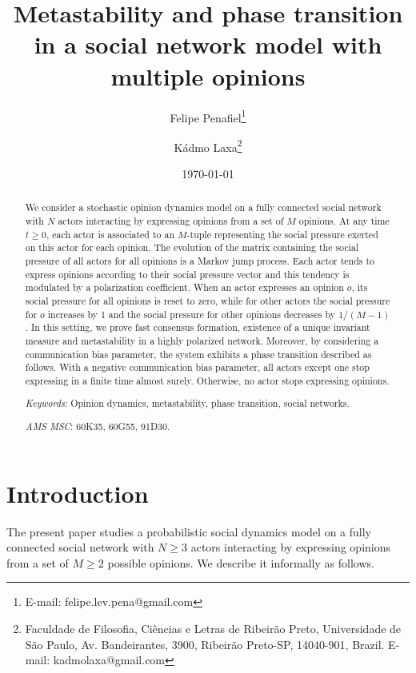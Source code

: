 \documentclass[11pt]{article}
\theoremstyle{definition}
\begin{document}
\title{
Metastability and phase transition in a social network model with multiple opinions}
\author{Felipe Penafiel\thanks{E-mail: felipe.lev.pena@gmail.com}  \\\and Kádmo Laxa\thanks{Faculdade de Filosofia, Ciências e Letras de Ribeirão Preto, Universidade de São Paulo, Av. Bandeirantes, 3900,
Ribeirão Preto-SP, 14040-901, Brazil.
 E-mail: kadmolaxa@gmail.com}}
\date{\today}
\maketitle

\begin{abstract} 
We consider a stochastic opinion dynamics model on a fully connected social network with $N$ actors interacting by expressing opinions from a set of $M$ opinions. At any time $t\geq 0$, each actor is associated to an $M$-tuple representing the social pressure exerted on this actor for each opinion. The evolution of the matrix containing the social pressure of all actors for all opinions is a Markov jump process. Each actor tends to express opinions according to their social pressure vector and this tendency is modulated by a polarization coefficient. When an actor expresses an opinion $o$, its social pressure for all opinions is reset to zero, while for other actors the social pressure for $o$ increases by 1 and the social pressure for other opinions decreases by $1/(M-1)$. 
In this setting, we prove fast consensus formation, existence of a unique invariant measure and metastability in a highly polarized network. Moreover, by considering a communication bias parameter, the system exhibits a phase transition described as follows. With a negative communication bias parameter, all actors except one stop expressing in a finite time almost surely. Otherwise, no actor stops expressing opinions.
 \vspace{0.2cm}
 
\textit{Keywords}: Opinion dynamics, metastability, phase transition, social networks.
 
 \vspace{0.2cm}
 
 \textit{AMS MSC}: 60K35, 60G55, 91D30.
\end{abstract}

\section{Introduction}

The present paper studies a probabilistic social dynamics model on a fully connected social network with $N\geq 3$ actors interacting by expressing opinions from a set of $M\geq 2$ possible opinions. We describe it informally as follows.
\end{document}
